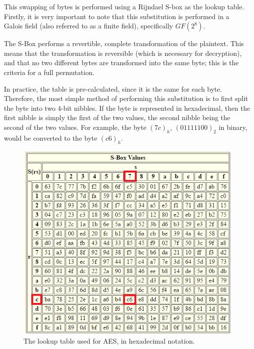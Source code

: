 \documentclass[12pt]{report}
\begin{document}
This swapping of bytes is performed using a Rijndael S-box as the lookup table. Firstly, it is very important to note that this substitution is performed in a Galois field (also referred to as a finite field)\cite{GaloisField}, specifically $GF(2^8)$.

The S-Box performs a revertible, complete transformation of the plaintext\cite{SBox}. This means that the transformation is reversible (which is necessary for decryption), and that no two different bytes are transformed into the same byte; this is the criteria for a full permutation.

In practice, the table is pre-calculated, since it is the same for each byte. Therefore, the most simple method of performing this substitution is to first split the byte into two 4-bit nibbles. If the byte is represented in hexadecimal, then the first nibble is simply the first of the two values, the second nibble being the second of the two values. For example, the byte $(7c)_h$, $(01111100)_2$ in binary, would be converted to the byte $(c6)_h$.

\begin{figure}[H]
\centering
\includegraphics[scale=1]{SBox.PNG}
\caption{The lookup table used for AES, in hexadecimal notation\cite{SBox}.}
\end{figure}

\end{document}
